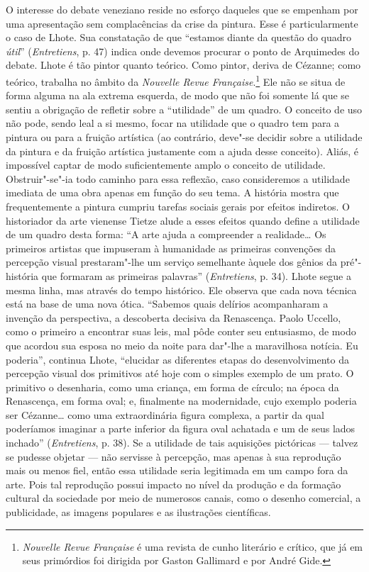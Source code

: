 O interesse do debate veneziano reside no esforço daqueles que se empenham por
uma apresentação sem complacências da crise da pintura. Esse é particularmente o caso
de Lhote. Sua constatação de que ``estamos diante da questão do quadro
\emph{útil}'' (\emph{Entretiens}, p. 47) indica onde devemos
procurar o ponto de Arquimedes do debate. Lhote é tão pintor quanto
teórico. Como pintor, deriva de Cézanne; como teórico, trabalha no âmbito
da \emph{Nouvelle Revue Française}.\footnote{\emph{Nouvelle Revue
  Française} é uma revista de cunho literário e
  crítico, que já em seus primórdios foi dirigida por Gaston Gallimard e
  por André Gide. \versal{[N.~O.]}} Ele não se situa de forma alguma na ala extrema
esquerda, de modo que não foi somente lá que se sentiu a obrigação de refletir sobre
a ``utilidade'' de um quadro. O conceito de uso não pode, sendo leal a si
mesmo, focar na utilidade que o quadro tem para a pintura ou para a
fruição artística (ao contrário, deve"-se decidir sobre a utilidade da pintura e da fruição artística justamente com a ajuda desse conceito). Aliás, é impossível captar de modo
suficientemente amplo o conceito de utilidade. Obstruir"-se"-ia todo
caminho para essa reflexão, caso consideremos a utilidade imediata de uma
obra apenas em função do seu tema. A história mostra que frequentemente a pintura
cumpriu tarefas sociais gerais por efeitos indiretos.
O historiador da arte vienense Tietze alude a esses efeitos quando define
a utilidade de um quadro desta forma: ``A arte ajuda a compreender a realidade\ldots{}
Os primeiros artistas que impuseram à humanidade as primeiras convenções
da percepção visual prestaram"-lhe um serviço semelhante àquele dos
gênios da pré"-história que formaram as primeiras palavras''
(\emph{Entretiens}, p. 34). Lhote segue a mesma linha, mas através do tempo
histórico. Ele observa que cada nova técnica está na base de uma nova
ótica. ``Sabemos quais delírios acompanharam a invenção da perspectiva,
a descoberta decisiva da Renascença. Paolo Uccello, como o primeiro a
encontrar suas leis, mal pôde conter seu entusiasmo, de modo que acordou
sua esposa no meio da noite para dar"-lhe a maravilhosa notícia. Eu
poderia'', continua Lhote, ``elucidar as diferentes etapas do
desenvolvimento da percepção visual dos primitivos até hoje com o
simples exemplo de um prato. O primitivo o desenharia, como uma
criança, em forma de círculo; na época da Renascença, em forma oval; e,
finalmente na modernidade, cujo exemplo poderia ser Cézanne\ldots{} como
uma extraordinária figura complexa, a partir da qual poderíamos
imaginar a parte inferior da figura oval achatada e um de seus lados
inchado'' (\emph{Entretiens}, p. 38). Se a utilidade de tais aquisições
pictóricas --- talvez se pudesse objetar --- não servisse à percepção, mas
apenas à sua reprodução mais ou menos fiel, então essa utilidade seria
legitimada em um campo fora da arte. Pois tal reprodução
possui impacto no nível da produção e da formação cultural da sociedade
por meio de numerosos canais, como o desenho comercial, a
publicidade, as imagens populares e as ilustrações científicas.

